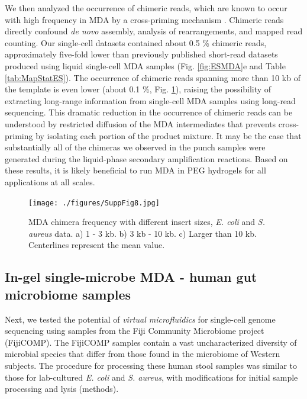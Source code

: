 We then analyzed the occurrence of chimeric reads, which are known to occur with high frequency in MDA by a cross-priming mechanism \cite{Lasken:2007db}. Chimeric reads directly confound \textit{de novo} assembly, analysis of rearrangements, and mapped read counting. Our single-cell datasets contained about 0.5 \% chimeric reads, approximately five-fold lower than previously published short-read datasets produced using liquid single-cell MDA samples (Fig. \ref{fig:ESMDA}e and Table \ref{tab:MapStatES}). The occurrence of chimeric reads spanning more than 10 kb of the template is even lower (about 0.1 \%, Fig. \ref{fig:Chimera10k}), raising the possibility of extracting long-range information from single-cell MDA samples using long-read sequencing. This dramatic reduction in the occurrence of chimeric reads can be understood by restricted diffusion of the MDA intermediates that prevents cross-priming by isolating each portion of the product mixture. It may be the case that substantially all of the chimeras we observed in the punch samples were generated during the liquid-phase secondary amplification reactions. Based on these results, it is likely beneficial to run MDA in PEG hydrogels for all applications at all scales. 

\begin{figure}
\centering
\texttt{[image: ./figures/SuppFig8.jpg]}
\caption[MDA chimera frequency with different insert sizes, \textit{E. coli} and \textit{S. aureus} data]{MDA chimera frequency with different insert sizes, \textit{E. coli} and \textit{S. aureus} data. a) 1 - 3 kb. b) 3 kb - 10 kb. c) Larger than 10 kb. Centerlines represent the mean value.}
\label{fig:Chimera10k}
\end{figure}

\subsection{In-gel single-microbe MDA - human gut microbiome samples}
Next, we tested the potential of \textit{virtual microfluidics} for single-cell genome sequencing using samples from the Fiji Community Microbiome project (FijiCOMP). The FijiCOMP samples contain a vast uncharacterized diversity of microbial species that differ from those found in the microbiome of Western subjects. The procedure for processing these human stool samples was similar to those for lab-cultured \textit{E. coli} and \textit{S. aureus}, with modifications for initial sample processing and lysis (methods).

